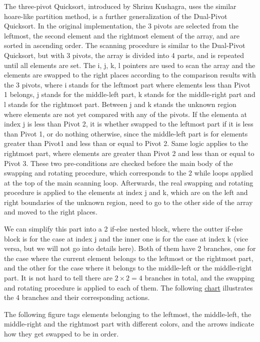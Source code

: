 \documentclass{article}
\begin{document}
The three-pivot Quicksort, introduced by Shrinu Kushagra, uses the similar hoare-like partition method, is a further generalization of the Dual-Pivot Quicksort.
In the original implementation, the 3 pivots are selected from the leftmost, the second element and the rightmost element of the array, and are sorted in ascending order.
The scanning procedure is similar to the Dual-Pivot Quicksort, but with 3 pivots, the array is divided into 4 parts, and is repeated until all elements are set.
The i, j, k, l pointers are used to scan the array and the elements are swapped to the right places according to the comparison results with the 3 pivots,
where i stands for the leftmost part where elements less than Pivot 1 belongs, j stands for the middle-left part, k stands for the middle-right part and l stands for the rightmost part.
Between j and k stands the unknown region where elements are not yet compared with any of the pivots. 
If the elementa at index j is less than Pivot 2, it is whether swapped to the leftmost part if it is less than Pivot 1,
or do nothing otherwise, since the middle-left part is for elements greater than Pivot1 and less than or equal to Pivot 2.
Same logic applies to the rightmost part, where elements are greater than Pivot 2 and less than or equal to Pivot 3.
These two pre-conditions are checked before the main body of the swapping and rotating procedure, which corresponds to the 2 while loops applied at the top of the main scanning loop.
Afterwards, the real swapping and rotating procedure is applied to the elements at index j and k, which are on the left and right boundaries of the unknown region, need to go to the other side of the array and moved to the right places.

We can simplify this part into a 2 if-else nested block, where the outter if-else block is for the case at index j and the inner one is for the case at index k (vice versa, but we will not go into details here).
Both of them have 2 branches, one for the case where the current element belongs to the leftmost or the rightmost part, and the other for the case where it belongs to the middle-left or the middle-right part.
It is not hard to tell there are $2 \times 2 = 4$ branches in total, and the swapping and rotating procedure is applied to each of them. The following \hyperlink{fig:3pivot}{chart} illustrates the 4 branches and their corresponding actions.

The following figure tags elements belonging to the leftmost, the middle-left, the middle-right and the rightmost part with different colors, and the arrows indicate how they get swapped to be in order.
\end{document}
